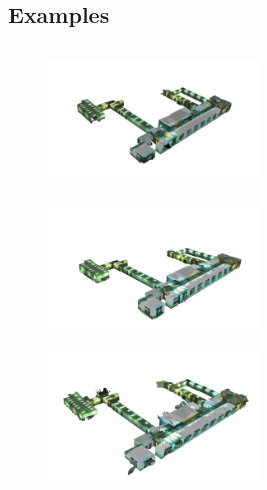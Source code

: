 \documentclass[]{spie}  %
\begin{document}
\subsection{Examples}
\label{sec:examples}

\begin{figure}
  \centering
  \includegraphics[width=2.2in,height=1.5in]{results_swarm_3_v.png}
  \includegraphics[width=2.2in,height=1.5in]{results_swarm_3_2d.png}
  \includegraphics[width=2.2in,height=1.5in]{results_swarm_3_3d.png}\\
   
\end{figure}
\end{document}
